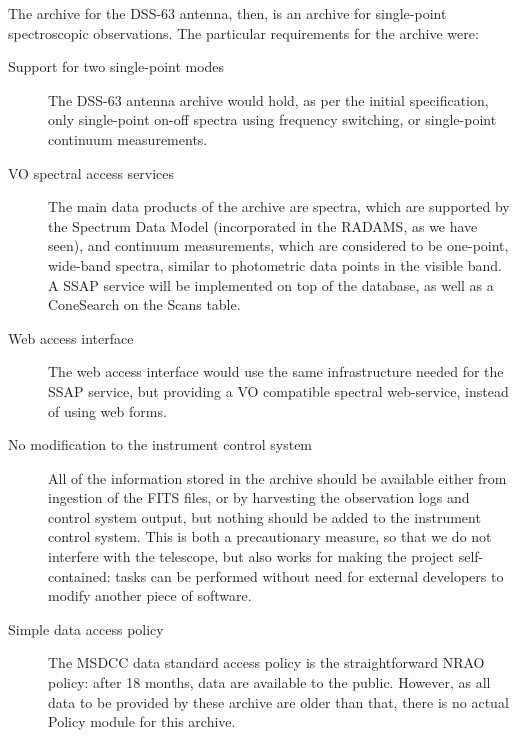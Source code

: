 			The archive for the DSS-63 antenna, then, is an
			archive for single-point spectroscopic observations.
			The particular requirements for the archive were:
			
			\begin{description}
				\item[Support for two single-point modes] The
				DSS-63 antenna archive would hold, as per the
				initial specification, only single-point on-off
				spectra using frequency switching, or
				single-point continuum measurements.
				
				\item[VO spectral access services] The main data
				products of the archive are spectra, which are
				supported by the Spectrum Data Model (incorporated
				in the RADAMS, as we have seen), and continuum
				measurements, which are considered to be one-point,
				wide-band spectra, similar to photometric data
				points in the visible band. A SSAP service will
				be implemented on top of the database, as well
				as a ConeSearch on the Scans table.
				
				\item[Web access interface] The web access
				interface would use the same infrastructure needed
				for the SSAP service, but providing a VO compatible
				spectral web-service, instead of using web forms.
				
				\item[No modification to the instrument control
				system] All of the information stored in the
				archive should be available either from ingestion
				of the FITS files, or by harvesting the observation
				logs and control system output, but nothing should
				be added to the instrument control system. This is
				both a precautionary measure, so that we do not
				interfere with the telescope, but also works for
				making the project self-contained: tasks can be
				performed without need for external developers to
				modify another piece of software.
				
				\item[Simple data access policy] The MSDCC data
				standard access policy is the
				straightforward NRAO policy: after 18 months, data
				are available to the public. However, as all data
				to be provided by these archive are older than that,
				there is no actual Policy module for this archive.
			\end{description}
			
		
